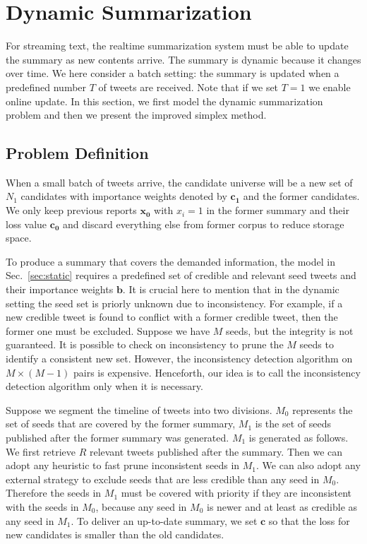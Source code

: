\documentclass[envcountsame]{llncs}
\begin{document}
\section{Dynamic Summarization}\label{sec:dynamic}
For streaming text, the realtime summarization system must be able to update the summary as new contents arrive. The summary is dynamic because it changes over time. We here consider a batch setting: the summary is updated when a predefined number $T$ of tweets are received. Note that if we set $T=1$ we enable online update.  In this section, we first model the dynamic summarization problem and then we present the improved simplex method.

\subsection{Problem Definition}
When a small batch of tweets arrive, the candidate universe will be a new set of $N_1 $ candidates with importance weights denoted by $\mathbf{c_1}$ and the former candidates. We only keep previous reports $\mathbf{x_0}$ with $x_i=1$ in the former summary and their loss value $\mathbf{c_0}$  and discard everything else from former corpus to reduce storage space.

To produce a summary that covers the demanded information, the model in Sec.~\ref{sec:static} requires a predefined set of credible and relevant seed tweets and their importance weights $\mathbf{b}$. It is crucial here to mention that in the dynamic setting the seed set is priorly unknown due to inconsistency. For example, if a new credible tweet is found to conflict with a former credible tweet, then the former one must be excluded. Suppose we have $M$ seeds, but the integrity is not guaranteed. It is possible to check on inconsistency to prune the $M$ seeds to identify a consistent new set. However, the inconsistency detection algorithm on $M\times (M-1)$ pairs is expensive. Henceforth, our idea is to call the inconsistency detection algorithm only when it is necessary. 

Suppose we segment the timeline of tweets into two divisions. $M_0$ represents the set of seeds that are covered by the former summary, $M_1$ is the set of seeds published after the former summary was generated. $M_1$ is generated as follows. We first retrieve $R$ relevant tweets published after the summary. Then we can adopt any heuristic to fast prune inconsistent seeds in $M_1$. We can also adopt any external strategy to exclude seeds that are less credible than any seed in $M_0$. Therefore the seeds in $M_1$ must be covered with priority if they are inconsistent with the seeds in $M_0$, because any seed in  $M_0$ is newer and at least as credible as any seed in $M_1$.  To deliver an up-to-date summary, we set $\mathbf{c}$ so that the loss for new candidates is smaller than the old candidates.
\end{document}
